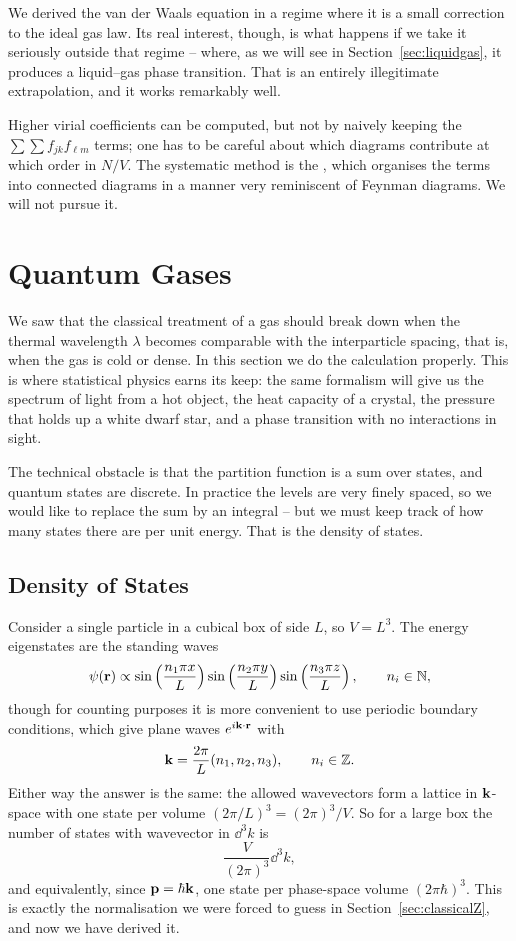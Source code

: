 \documentclass[a4paper]{scrartcl}
\begin{document}
We derived the van der Waals equation in a regime where it is a small correction to the ideal gas law. Its real interest, though, is what happens if we take it seriously outside that regime -- where, as we will see in Section~\ref{sec:liquidgas}, it produces a liquid--gas phase transition. That is an entirely illegitimate extrapolation, and it works remarkably well.

Higher virial coefficients can be computed, but not by naively keeping the $\sum\sum f_{jk}f_{\ell m}$ terms; one has to be careful about which diagrams contribute at which order in $N/V$. The systematic method is the , which organises the terms into connected diagrams in a manner very reminiscent of Feynman diagrams. We will not pursue it.

\section{Quantum Gases}\label{sec:quantumgases}

We saw that the classical treatment of a gas should break down when the thermal wavelength $\lambda$ becomes comparable with the interparticle spacing, that is, when the gas is cold or dense. In this section we do the calculation properly. This is where statistical physics earns its keep: the same formalism will give us the spectrum of light from a hot object, the heat capacity of a crystal, the pressure that holds up a white dwarf star, and a phase transition with no interactions in sight.

The technical obstacle is that the partition function is a sum over states, and quantum states are discrete. In practice the levels are very finely spaced, so we would like to replace the sum by an integral -- but we must keep track of how many states there are per unit energy. That is the density of states.

\subsection{Density of States}\label{sec:dos}

Consider a single particle in a cubical box of side $L$, so $V = L^3$. The energy eigenstates are the standing waves
$$
\psi(\mathbf{r}) \propto \sin\left(\frac{n_1 \pi x}{L}\right)\sin\left(\frac{n_2\pi y}{L}\right)\sin\left(\frac{n_3 \pi z}{L}\right), \qquad n_i \in \mathbb{N},
$$
though for counting purposes it is more convenient to use periodic boundary conditions, which give plane waves $e^{i\mathbf{k} \cdot \mathbf{r}}$ with
$$
\mathbf{k} = \frac{2\pi}{L}(n_1, n_2, n_3), \qquad n_i \in \mathbb{Z}.
$$
Either way the answer is the same: the allowed wavevectors form a lattice in $\mathbf{k}$-space with one state per volume $(2\pi/L)^3 = (2\pi)^3/V$. So for a large box the number of states with wavevector in $\dd^3 k$ is
$$
\frac{V}{(2\pi)^3}\dd^3 k,
$$
and equivalently, since $\mathbf{p} = \hbar \mathbf{k}$, one state per phase-space volume $(2\pi\hbar)^3$. This is exactly the normalisation we were forced to guess in Section~\ref{sec:classicalZ}, and now we have derived it.
\end{document}
